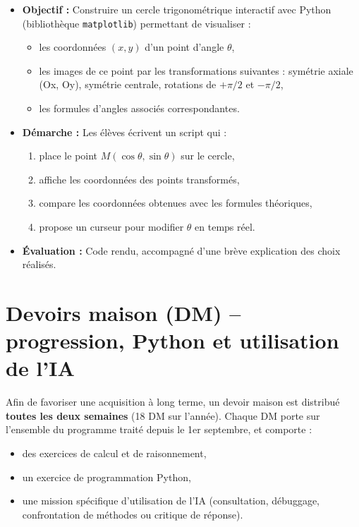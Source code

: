 \documentclass[a4paper,12pt]{article}
\begin{document}
	\begin{itemize}
		\item \textbf{Objectif :} Construire un cercle trigonométrique interactif avec Python (bibliothèque \texttt{matplotlib}) permettant de visualiser :
		\begin{itemize}
			\item les coordonnées $(x,y)$ d’un point d’angle $\theta$,
			\item les images de ce point par les transformations suivantes : symétrie axiale (Ox, Oy), symétrie centrale, rotations de $+\pi/2$ et $-\pi/2$,
			\item les formules d’angles associés correspondantes.
		\end{itemize}
		\item \textbf{Démarche :} Les élèves écrivent un script qui :
		\begin{enumerate}
			\item place le point $M(\cos\theta,\sin\theta)$ sur le cercle,
			\item affiche les coordonnées des points transformés,
			\item compare les coordonnées obtenues avec les formules théoriques,
			\item propose un curseur pour modifier $\theta$ en temps réel.
		\end{enumerate}
		\item \textbf{Évaluation :} Code rendu, accompagné d’une brève explication des choix réalisés.
	\end{itemize}
	
	\section{Devoirs maison (DM) -- progression, Python et utilisation de l’IA}
	
	Afin de favoriser une acquisition à long terme, un devoir maison est distribué \textbf{toutes les deux semaines} (18 DM sur l’année).  
	Chaque DM porte sur l’ensemble du programme traité depuis le 1er septembre, et comporte :
	\begin{itemize}
		\item des exercices de calcul et de raisonnement,
		\item un exercice de programmation Python,
		\item une mission spécifique d’utilisation de l’IA (consultation, débuggage, confrontation de méthodes ou critique de réponse).
	\end{itemize}
	
\end{document}
